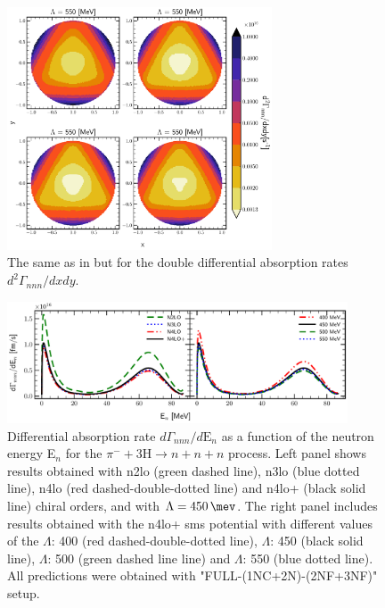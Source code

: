     \begin{figure}[h]
        \begin{center}
        \includegraphics[width=0.7\textwidth]{PlotData/PION/Dalitz_maps/figures/Dalitz_map_nnn_xy_orders.pdf}
        \end{center}
        \caption{The same as in  but for the double differential absorption rates
        $d^2 \Gamma_{nnn}/dxdy$.}
        \label{pion_nnn_xy_order}
    \end{figure}


    \begin{figure}[h]
        \begin{center}
        \includegraphics[width=0.9\textwidth]{PlotData/PION/Dalitz_maps/figures/3H_dGdEn.pdf}
        \end{center}
        \caption{Differential absorption rate $d\Gamma_{nnn} /d\text{E}_n$ 
        as a function of the neutron energy E$_n$ for the 
        $\pi^- + 3\text{H} \rightarrow n + n + n$ process.
        Left panel shows results obtained with \gls{n2lo} (green dashed line),
        \gls{n3lo} (blue dotted line), \gls{n4lo} (red dashed-double-dotted line)
        and \gls{n4lo+} (black solid line) chiral orders, and with $\Lambda = \SI{450}{\mev}$.
        The right panel includes results obtained with the \gls{n4lo+} \gls{sms} potential
        with different values of the $\Lambda$: \SI{400}{\mev} (red dashed-double-dotted line),
        $\Lambda$: \SI{450}{\mev} (black solid line),
        $\Lambda$: \SI{500}{\mev} (green dashed line line) and
        $\Lambda$: \SI{550}{\mev} (blue dotted line).
        All predictions were obtained with "FULL-(1NC+2N)-(2NF+3NF)" setup.}
        \label{pion_dGdEn_3H}
    \end{figure}

